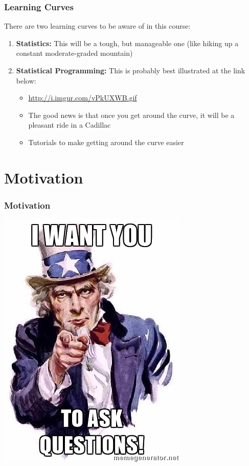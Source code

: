 \documentclass{beamer}
\begin{document}
\begin{frame}
\frametitle{Learning Curves}
	There are two learning curves to be aware of in this course:
	\begin{enumerate}[<+- | alert@+>]
		\item \textbf{Statistics:} This will be a tough, but manageable one (like hiking up a constant moderate-graded mountain)
		\item \textbf{Statistical Programming:} This is probably best illustrated at the link below:
		\begin{itemize}
			\item \url{http://i.imgur.com/vPkUXWB.gif}
			\item The good news is that once you get around the curve, it will be a pleasant ride in a 			Cadillac
			\item Tutorials to make getting around the curve easier
		\end{itemize}
	\end{enumerate}
\end{frame}

\section{Motivation}
\begin{frame}
\frametitle{Motivation}
	\begin{center}
		\includegraphics[scale=0.6]{./images/uncle_sam.jpg}
	\end{center}
\end{frame}
\end{document}
